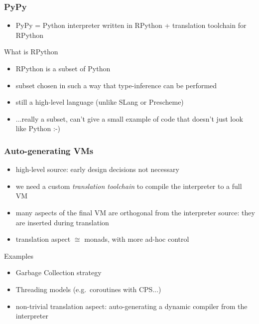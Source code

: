 \documentclass[utf8x]{beamer}
\begin{document}
\begin{frame}
  \frametitle{PyPy}
  \begin{itemize}
  \item
    PyPy = Python interpreter written in RPython + translation toolchain
    for RPython
  \end{itemize}
  \pause
  \begin{block}{
    What is RPython}
    \begin{itemize}
    \item
      RPython is a subset of Python
    \item
      subset chosen in such a way that type-inference can be performed
    \item
      still a high-level language (unlike SLang or Prescheme)
    \item
      ...really a subset, can't give a small example of code that
      doesn't just look like Python :-)
    \end{itemize}
  \end{block}
\end{frame}

\begin{frame}
  \frametitle{Auto-generating VMs}
  \begin{itemize}
  \item
    high-level source: early design decisions not necessary
  \item
    we need a custom \emph{translation toolchain} to compile the interpreter
    to a full VM
  \item
    many aspects of the final VM are orthogonal from the interpreter source:
    they are inserted during translation
  \item
    translation aspect $\cong$ monads, with more ad-hoc control
  \end{itemize}
  \pause
  \begin{block}{
    Examples}
    \begin{itemize}
    \item
      Garbage Collection strategy
    \item
      Threading models (e.g.\ coroutines with CPS...)
    \item
      non-trivial translation aspect: auto-generating a dynamic compiler from
      the interpreter
    \end{itemize}
  \end{block}
\end{frame}
\end{document}
